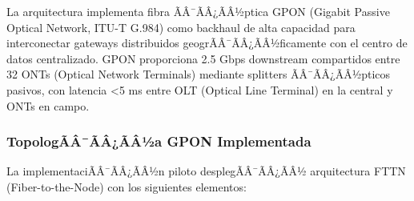 La arquitectura implementa fibra ÃÂ¯ÃÂ¿ÃÂ½ptica GPON (Gigabit Passive Optical Network, ITU-T G.984) como backhaul de alta capacidad para interconectar gateways distribuidos geogrÃÂ¯ÃÂ¿ÃÂ½ficamente con el centro de datos centralizado. GPON proporciona 2.5 Gbps downstream compartidos entre 32 ONTs (Optical Network Terminals) mediante splitters ÃÂ¯ÃÂ¿ÃÂ½pticos pasivos, con latencia <5 ms entre OLT (Optical Line Terminal) en la central y ONTs en campo.

\subsubsection{TopologÃÂ¯ÃÂ¿ÃÂ½a GPON Implementada}

La implementaciÃÂ¯ÃÂ¿ÃÂ½n piloto desplegÃÂ¯ÃÂ¿ÃÂ½ arquitectura FTTN (Fiber-to-the-Node) con los siguientes elementos:

